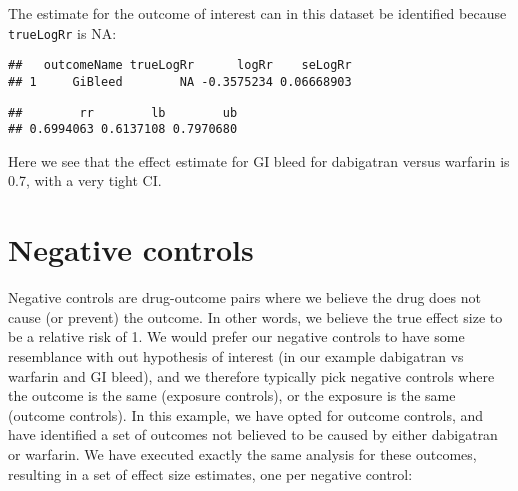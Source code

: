 \documentclass[]{article}
\newenvironment{Shaded}{\begin{snugshade}}{\end{snugshade}}
\newcommand{\KeywordTok}[1]{\textcolor[rgb]{0.13,0.29,0.53}{\textbf{#1}}}
\newcommand{\NormalTok}[1]{#1}
\newcommand{\OperatorTok}[1]{\textcolor[rgb]{0.81,0.36,0.00}{\textbf{#1}}}
\newcommand{\StringTok}[1]{\textcolor[rgb]{0.31,0.60,0.02}{#1}}
\begin{document}
The estimate for the outcome of interest can in this dataset be
identified because \texttt{trueLogRr} is NA:

\begin{Shaded}
\end{Shaded}

\begin{verbatim}
##   outcomeName trueLogRr      logRr    seLogRr
## 1     GiBleed        NA -0.3575234 0.06668903
\end{verbatim}

\begin{Shaded}
\end{Shaded}

\begin{verbatim}
##        rr        lb        ub 
## 0.6994063 0.6137108 0.7970680
\end{verbatim}

Here we see that the effect estimate for GI bleed for dabigatran versus
warfarin is 0.7, with a very tight CI.

\hypertarget{negative-controls}{%
\section{Negative controls}\label{negative-controls}}

Negative controls are drug-outcome pairs where we believe the drug does
not cause (or prevent) the outcome. In other words, we believe the true
effect size to be a relative risk of 1. We would prefer our negative
controls to have some resemblance with out hypothesis of interest (in
our example dabigatran vs warfarin and GI bleed), and we therefore
typically pick negative controls where the outcome is the same (exposure
controls), or the exposure is the same (outcome controls). In this
example, we have opted for outcome controls, and have identified a set
of outcomes not believed to be caused by either dabigatran or warfarin.
We have executed exactly the same analysis for these outcomes, resulting
in a set of effect size estimates, one per negative control:
\end{document}

